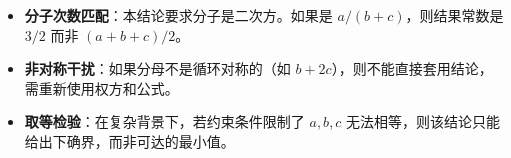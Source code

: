 \begin{trapbox}
\begin{itemize}
    \item \textbf{分子次数匹配}：本结论要求分子是二次方。如果是 $a/(b+c)$，则结果常数是 $3/2$ 而非 $(a+b+c)/2$。
    \item \textbf{非对称干扰}：如果分母不是循环对称的（如 $b+2c$），则不能直接套用结论，需重新使用权方和公式。
    \item \textbf{取等检验}：在复杂背景下，若约束条件限制了 $a,b,c$ 无法相等，则该结论只能给出下确界，而非可达的最小值。
\end{itemize}
\end{trapbox}